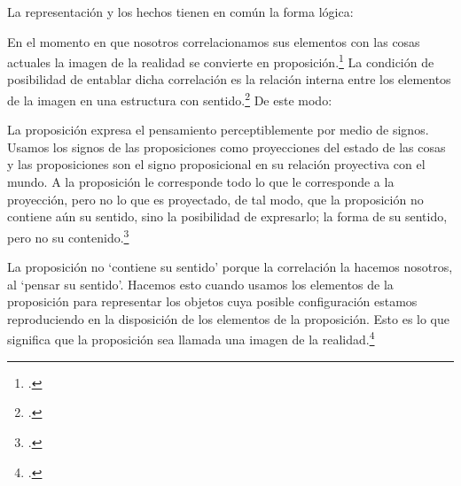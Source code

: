 La representación y los hechos tienen en común la forma lógica:


En el momento en que nosotros correlacionamos sus elementos con las cosas
actuales la imagen de la realidad se convierte en
proposición.\footcite[cf.~][p.~73]{IWT} La condición de posibilidad de entablar
dicha correlación es la relación interna entre los elementos de la imagen en una
estructura con sentido.\footcite[cf.~][p.~68]{IWT} De este modo:

La proposición expresa el pensamiento perceptiblemente por medio de signos.
Usamos los signos de las proposiciones como proyecciones del estado de las cosas
y las proposiciones son el signo proposicional en su relación proyectiva con el
mundo. A la proposición le corresponde todo lo que le corresponde a la
proyección, pero no lo que es proyectado, de tal modo, que la proposición no
contiene aún su sentido, sino la posibilidad de expresarlo; la forma de su
sentido, pero no su contenido.\footcite[cf.~][3.1,3.11-3.13]{tractatus} 

La proposición no `contiene su sentido' porque la correlación la hacemos nosotros,
al `pensar su sentido'. Hacemos esto cuando usamos los elementos de la
proposición para representar los objetos cuya posible configuración estamos 
reproduciendo en la disposición de los elementos de la proposición. Esto es lo
que significa que la proposición sea llamada una imagen de la
realidad.\footcite[cf.~][p.69]{IWT}  

